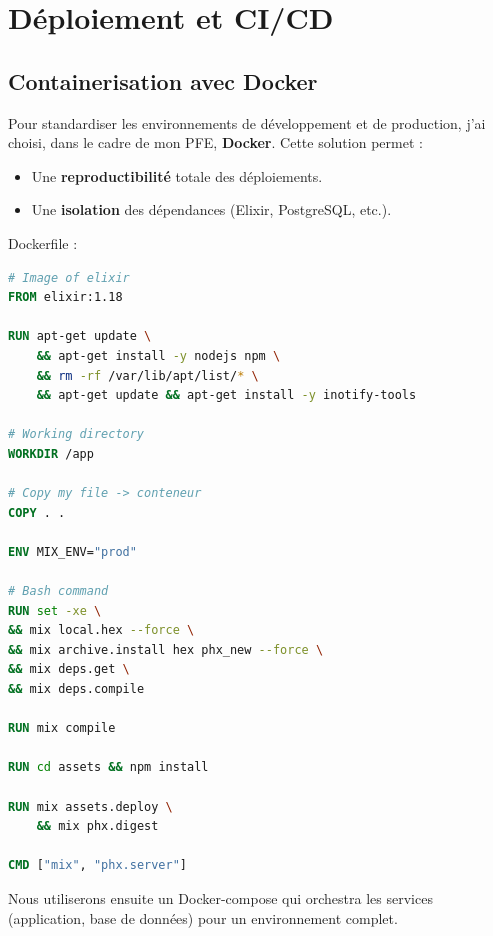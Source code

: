 \chapter{Déploiement et CI/CD}

\section{Containerisation avec Docker}

Pour standardiser les environnements de développement et de production, j’ai choisi, dans le cadre de mon PFE, \textbf{Docker}.
Cette solution permet :
\begin{itemize}
    \item Une \textbf{reproductibilité} totale des déploiements.
    \item Une \textbf{isolation} des dépendances (Elixir, PostgreSQL, etc.).
    \newline
\end{itemize}

\begin{for_you}{Dockerfile :}
\begin{lstlisting}[language=dockerfile]
# Image of elixir
FROM elixir:1.18

RUN apt-get update \
    && apt-get install -y nodejs npm \
    && rm -rf /var/lib/apt/list/* \
    && apt-get update && apt-get install -y inotify-tools

# Working directory 
WORKDIR /app

# Copy my file -> conteneur
COPY . .

ENV MIX_ENV="prod"

# Bash command
RUN set -xe \
&& mix local.hex --force \
&& mix archive.install hex phx_new --force \
&& mix deps.get \
&& mix deps.compile

RUN mix compile

RUN cd assets && npm install

RUN mix assets.deploy \
    && mix phx.digest

CMD ["mix", "phx.server"]

\end{lstlisting}
\end{for_you}

\newpage

Nous utiliserons ensuite un Docker-compose qui orchestra les services (application, base de données) pour un environnement complet.
\newline

